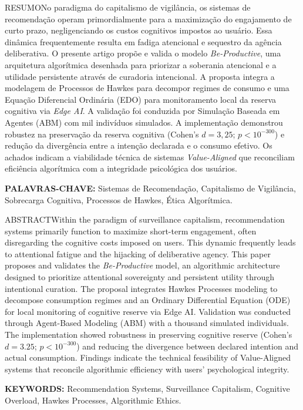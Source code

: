 \begin{abstractblock}{RESUMO}{No paradigma do capitalismo de vigilância, os sistemas de recomendação operam primordialmente para a maximização do engajamento de curto prazo, negligenciando os custos cognitivos impostos ao usuário. Essa dinâmica frequentemente resulta em fadiga atencional e sequestro da agência deliberativa. O presente artigo propõe e valida o modelo \textit{Be-Productive}, uma arquitetura algorítmica desenhada para priorizar a soberania atencional e a utilidade persistente através de curadoria intencional. A proposta integra a modelagem de Processos de Hawkes para decompor regimes de consumo e uma Equação Diferencial Ordinária (EDO) para monitoramento local da reserva cognitiva via \textit{Edge AI}. A validação foi conduzida por Simulação Baseada em Agentes (ABM) com mil indivíduos simulados. A implementação demonstrou robustez na preservação da reserva cognitiva (Cohen’s $d = 3,25$; $p < 10^{-300}$) e redução da divergência entre a intenção declarada e o consumo efetivo. Os achados indicam a viabilidade técnica de sistemas \textit{Value-Aligned} que reconciliam eficiência algorítmica com a integridade psicológica dos usuários.}
\end{abstractblock}
\noindent \textbf{PALAVRAS-CHAVE:} Sistemas de Recomendação, Capitalismo de Vigilância, Sobrecarga Cognitiva, Processos de Hawkes, Ética Algorítmica.

\vspace{0.3cm}

\begin{abstractblock}{ABSTRACT}{Within the paradigm of surveillance capitalism, recommendation systems primarily function to maximize short-term engagement, often disregarding the cognitive costs imposed on users. This dynamic frequently leads to attentional fatigue and the hijacking of deliberative agency. This paper proposes and validates the \textit{Be-Productive} model, an algorithmic architecture designed to prioritize attentional sovereignty and persistent utility through intentional curation. The proposal integrates Hawkes Processes modeling to decompose consumption regimes and an Ordinary Differential Equation (ODE) for local monitoring of cognitive reserve via Edge AI. Validation was conducted through Agent-Based Modeling (ABM) with a thousand simulated individuals. The implementation showed robustness in preserving cognitive reserve (Cohen’s $d = 3.25$; $p < 10^{-300}$) and reducing the divergence between declared intention and actual consumption. Findings indicate the technical feasibility of Value-Aligned systems that reconcile algorithmic efficiency with users' psychological integrity.}
\end{abstractblock}
\noindent \textbf{KEYWORDS:} Recommendation Systems, Surveillance Capitalism, Cognitive Overload, Hawkes Processes, Algorithmic Ethics.

